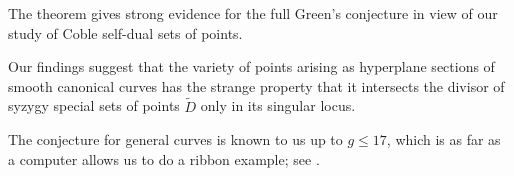 The theorem gives strong evidence for the full Green's conjecture in
view of our study of Coble self-dual sets of points.  

\medskip
Our findings suggest that the variety of points arising as 
hyperplane sections of smooth canonical curves has the strange
property that it intersects the divisor of syzygy special sets of
points $\tilde D$ only in its singular locus. 

\bigskip
The conjecture for general curves is known to us up to $g \le 17$, which is 
as far as a computer allows us to do a ribbon example; see \cite{CO:BaEi}.

